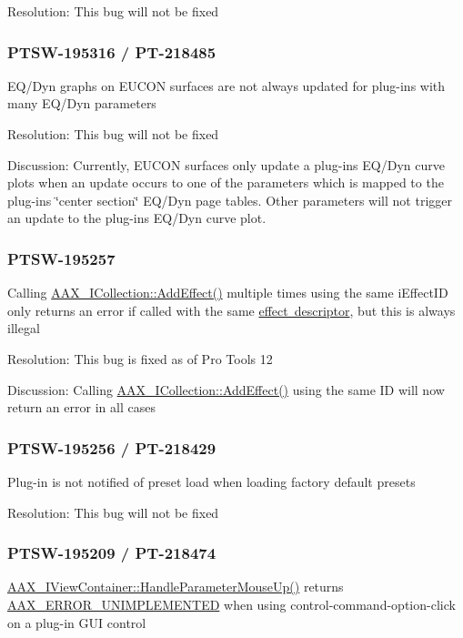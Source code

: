 Resolution\+: This bug will not be fixed\hypertarget{a00846_PTSW-195316}{}\subsubsection{P\+T\+S\+W-\/195316 / P\+T-\/218485}\label{a00846_PTSW-195316}
E\+Q/\+Dyn graphs on E\+U\+C\+ON surfaces are not always updated for plug-\/ins with many E\+Q/\+Dyn parameters

Resolution\+: This bug will not be fixed

Discussion\+: Currently, E\+U\+C\+ON surfaces only update a plug-\/in\textquotesingle{}s E\+Q/\+Dyn curve plots when an update occurs to one of the parameters which is mapped to the plug-\/in\textquotesingle{}s \char`\"{}center section\char`\"{} E\+Q/\+Dyn page tables. Other parameters will not trigger an update to the plug-\/in\textquotesingle{}s E\+Q/\+Dyn curve plot.\hypertarget{a00846_PTSW-195257}{}\subsubsection{P\+T\+S\+W-\/195257}\label{a00846_PTSW-195257}
Calling \mbox{\hyperlink{a01777_a5ff114b8c4da2081515186f2faf65c8c}{A\+A\+X\+\_\+\+I\+Collection\+::\+Add\+Effect()}} multiple times using the same {\ttfamily i\+Effect\+ID} only returns an error if called with the same \mbox{\hyperlink{a01813}{effect descriptor}}, but this is always illegal

Resolution\+: This bug is fixed as of Pro Tools 12

Discussion\+: Calling \mbox{\hyperlink{a01777_a5ff114b8c4da2081515186f2faf65c8c}{A\+A\+X\+\_\+\+I\+Collection\+::\+Add\+Effect()}} using the same ID will now return an error in all cases\hypertarget{a00846_PTSW-195256}{}\subsubsection{P\+T\+S\+W-\/195256 / P\+T-\/218429}\label{a00846_PTSW-195256}
Plug-\/in is not notified of preset load when loading factory default presets

Resolution\+: This bug will not be fixed\hypertarget{a00846_PTSW-195209}{}\subsubsection{P\+T\+S\+W-\/195209 / P\+T-\/218474}\label{a00846_PTSW-195209}
\mbox{\hyperlink{a01889_a28458b791dc2fede05e64c1e5f596855}{A\+A\+X\+\_\+\+I\+View\+Container\+::\+Handle\+Parameter\+Mouse\+Up()}} returns \mbox{\hyperlink{a00494_a5f8c7439f3a706c4f8315a9609811937a3b76994b32b97fcd56b19ef8032245df}{A\+A\+X\+\_\+\+E\+R\+R\+O\+R\+\_\+\+U\+N\+I\+M\+P\+L\+E\+M\+E\+N\+T\+ED}} when using control-\/command-\/option-\/click on a plug-\/in G\+UI control

